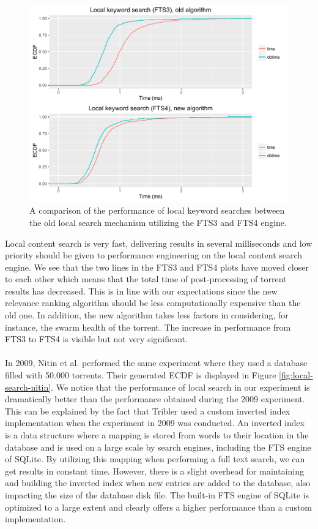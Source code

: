 \begin{figure}[h!]
	\centering
	\includegraphics[width=1.0\columnwidth]{images/experiments/local_search_fts3_fts4}
	\caption{A comparison of the performance of local keyword searches between the old local search mechanism utilizing the FTS3 and FTS4 engine.}
	\label{fig:local-search-fts3-fts4}
\end{figure}

Local content search is very fast, delivering results in several milliseconds and low priority should be given to performance engineering on the local content search engine. We see that the two lines in the FTS3 and FTS4 plots have moved closer to each other which means that the total time of post-processing of torrent results has decreased. This is in line with our expectations since the new relevance ranking algorithm should be less computationally expensive than the old one. In addition, the new algorithm takes less factors in considering, for instance, the swarm health of the torrent. The increase in performance from FTS3 to FTS4 is visible but not very significant.\\\\
In 2009, Nitin et al. performed the same experiment where they used a database filled with 50.000 torrents. Their generated ECDF is displayed in Figure \ref{fig:local-search-nitin}. We notice that the performance of local search in our experiment is dramatically better than the performance obtained during the 2009 experiment. This can be explained by the fact that Tribler used a custom inverted index implementation when the experiment in 2009 was conducted. An inverted index is a data structure where a mapping is stored from words to their location in the database and is used on a large scale by search engines, including the FTS engine of SQLite. By utilizing this mapping when performing a full text search, we can get results in constant time. However, there is a slight overhead for maintaining and building the inverted index when new entries are added to the database, also impacting the size of the database disk file. The built-in FTS engine of SQLite is optimized to a large extent and clearly offers a higher performance than a custom implementation.

